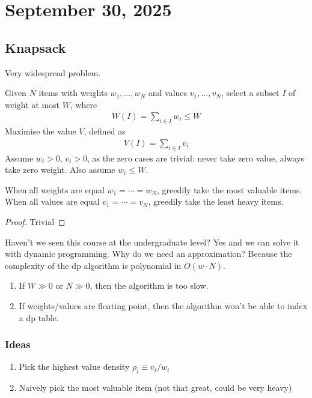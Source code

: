 \section{September 30, 2025}

\subsection{Knapsack}
Very widespread problem.
\begin{definition}
    Given $N$ items with weights $w_1, \ldots, w_N$ and values $v_1, \ldots, v_N$, select a subset $I$ of weight at most $W$, where
    \begin{align}
        W(I) = \sum_{i \in I} w_i \le W
    \end{align}
    Maximise the value $V$, defined as
    \begin{align}
        V(I) = \sum_{i \in I} v_i
    \end{align}
    Assume $w_i > 0$, $v_i > 0$, as the zero cases are trivial: never take zero value, always take zero weight. Also assume $w_i \le W$.
\end{definition}

\begin{lemma}
    When all weights are equal $w_1 = \cdots = w_N$, greedily take the most valuable items. When all values are equal $v_1 = \cdots = v_N$, greedily take the least heavy items.
    \begin{proof}
        Trivial
    \end{proof}
\end{lemma}


\begin{aside}
    Haven't we seen this course at the undergraduate level? Yes and we can solve it with dynamic programming. Why do we need an approximation? Because the complexity of the dp algorithm is polynomial in $O(w \cdot N)$.
    \begin{enumerate}
        \item If $W \gg 0$ or $N \gg 0$, then the algorithm is too slow.
        \item If weights/values are floating point, then the algorithm won't be able to index a dp table.
    \end{enumerate}
\end{aside}

\subsubsection{Ideas}
\begin{enumerate}
    \item Pick the highest value density $\rho_i \equiv v_i/w_i$
    \item Naively pick the most valuable item (not that great, could be very heavy)
\end{enumerate}

